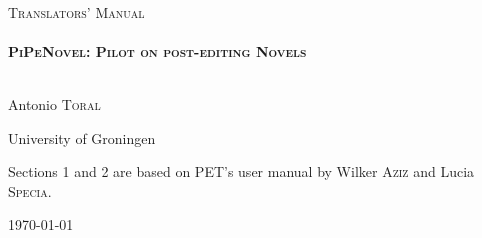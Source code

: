 \begin{titlepage}

\begin{center}



\vspace{5cm}

\textsc{
\LARGE \textsc{}}\\[5cm]



\textsc{
\LARGE \textsc{Translators' Manual}}\\[1.5cm]




\HRule \\[0.4cm]
{ \huge \bfseries \textsc{PiPeNovel: Pilot on post-editing Novels} }\\[0.4cm]
\HRule \\[1.5cm]







\begin{minipage}{0.4\textwidth}
\begin{flushleft} %
Antonio \textsc{Toral}
\end{flushleft}
\end{minipage}
\begin{minipage}{0.4\textwidth}
\begin{flushright} %
University of Groningen\\
\end{flushright}
\end{minipage}

\vspace{3cm}

Sections 1 and 2 are based on PET's user manual by Wilker \textsc{Aziz} and Lucia \textsc{Specia}.

\vfill

{\large \today}

\end{center}

\end{titlepage}